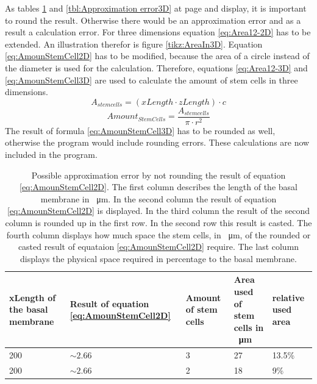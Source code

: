As tables \ref{tbl:Approximation error2D} and \ref{tbl:Approximation error3D} at page \pageref{tbl:Approximation error2D} and \pageref{tbl:Approximation error3D} display, it is important to round the result. Otherwise there would be an approximation error and as a result a calculation error. \newline
For three dimensions equation \ref{eq:Area12-2D} has to be extended. An illustration therefor is figure \ref{tikz:AreaIn3D}. Equation \ref{eq:AmounStemCell2D} has to be modified, because the area of a circle instead of the diameter is used for the calculation. Therefore, equations \ref{eq:Area12-3D} and \ref{eq:AmounStemCell3D} are used to calculate the amount of stem cells in three dimensions.
\begin{equation}\label{eq:Area12-3D}
A_{stem cells} = (xLength \cdot zLength) \cdot c
\end{equation}
\begin{equation}\label{eq:AmounStemCell3D}
Amount_{StemCells} = \dfrac{A_{stem cells}}{\pi \cdot r^{2}} 
\end{equation}
The result of formula \ref{eq:AmounStemCell3D} has to be rounded as well, otherwise the program would include rounding errors. 
These calculations are now included in the program.


\begin{table}[ht]
\centering
\caption[Approximation errors of a not rounded result, with which it is further calculated]{Possible approximation error by not rounding the result of equation \ref{eq:AmounStemCell2D}. The first column describes the length of the basal membrane in \SI{}{\micro\metre}. In the second column the result of equation \ref{eq:AmounStemCell2D} is displayed. In the third column the result of the second column is rounded up in the first row. In the second row this result is casted. The fourth column displays how much space the stem cells, in \SI{}{\micro\metre}, of the rounded or casted result of equataion \ref{eq:AmounStemCell2D} require. The last column displays the physical space required in percentage to the basal membrane. \newline}
\renewcommand{\arraystretch}{1.5}
	\begin{tabularx}{\textwidth}{|X|X|X|X|X|}
	\hline
		xLength of the basal membrane & Result of equation \ref{eq:AmounStemCell2D} & Amount of stem cells & Area used of stem cells  in \SI{}{\micro\metre} & relative used area  \\
		\hline
	\hline
		
		200 & $\sim 2.66$ & 3 & 27 & 13.5\% \\
		\hline
		200 & $\sim 2.66$ & 2 & 18 & 9\% 
\tabularnewline
\hline 
	\end{tabularx}
	\label{tbl:Approximation error2D}
\end{table}


